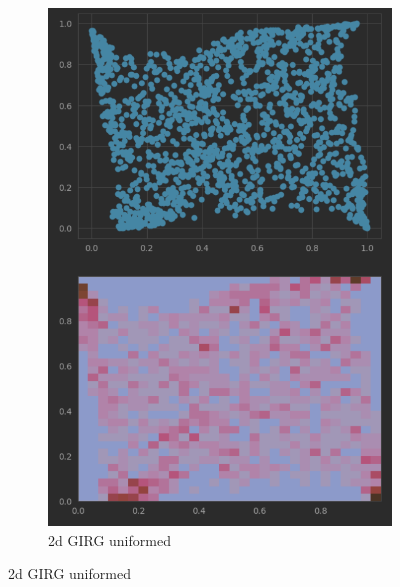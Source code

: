 \begin{figure}
\begin{subfigure}{0.45\textwidth}
      \includegraphics[width=\linewidth]{figures/diffmap_plot_uniformed.png}
      \caption{2d GIRG uniformed}
      \label{fig:sub2}
    \end{subfigure}
  
    \vspace{1em}
  

\end{figure}

